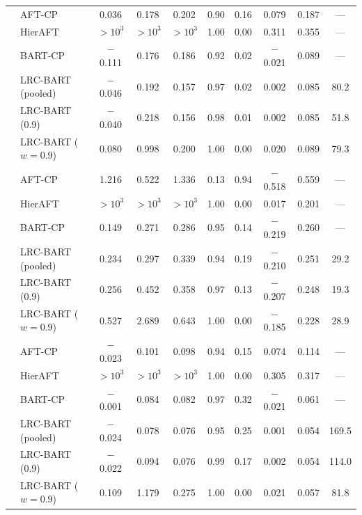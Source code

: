 \documentclass[11pt]{article}
\theoremstyle{definition}
\theoremstyle{plain}
\begin{document}
\begin{longtable}{llcccccccc}
\midrule
{} & AFT-CP & 0.036 & 0.178 & 0.202 & 0.90 & 0.16 & 0.079 & 0.187 & --- \\*
& HierAFT & $>\!10^{3}$ & $>\!10^{3}$ & $>\!10^{3}$ & 1.00 & 0.00 & 0.311 & 0.355 & --- \\*
& BART-CP & $-$0.111 & 0.176 & 0.186 & 0.92 & 0.02 & $-$0.021 & 0.089 & --- \\*
& LRC-BART (pooled) & $-$0.046 & 0.192 & 0.157 & 0.97 & 0.02 & 0.002 & 0.085 & 80.2 \\*
& LRC-BART (0.9) & $-$0.040 & 0.218 & 0.156 & 0.98 & 0.01 & 0.002 & 0.085 & 51.8 \\*
& LRC-BART ($w=0.9$) & 0.080 & 0.998 & 0.200 & 1.00 & 0.00 & 0.020 & 0.089 & 79.3 \\
\midrule
{} & AFT-CP & 1.216 & 0.522 & 1.336 & 0.13 & 0.94 & $-$0.518 & 0.559 & --- \\*
& HierAFT & $>\!10^{3}$ & $>\!10^{3}$ & $>\!10^{3}$ & 1.00 & 0.00 & 0.017 & 0.201 & --- \\*
& BART-CP & 0.149 & 0.271 & 0.286 & 0.95 & 0.14 & $-$0.219 & 0.260 & --- \\*
& LRC-BART (pooled) & 0.234 & 0.297 & 0.339 & 0.94 & 0.19 & $-$0.210 & 0.251 & 29.2 \\*
& LRC-BART (0.9) & 0.256 & 0.452 & 0.358 & 0.97 & 0.13 & $-$0.207 & 0.248 & 19.3 \\*
& LRC-BART ($w=0.9$) & 0.527 & 2.689 & 0.643 & 1.00 & 0.00 & $-$0.185 & 0.228 & 28.9 \\
\midrule
{} & AFT-CP & $-$0.023 & 0.101 & 0.098 & 0.94 & 0.15 & 0.074 & 0.114 & --- \\*
& HierAFT & $>\!10^{3}$ & $>\!10^{3}$ & $>\!10^{3}$ & 1.00 & 0.00 & 0.305 & 0.317 & --- \\*
& BART-CP & $-$0.001 & 0.084 & 0.082 & 0.97 & 0.32 & $-$0.021 & 0.061 & --- \\*
& LRC-BART (pooled) & $-$0.024 & 0.078 & 0.076 & 0.95 & 0.25 & 0.001 & 0.054 & 169.5 \\*
& LRC-BART (0.9) & $-$0.022 & 0.094 & 0.076 & 0.99 & 0.17 & 0.002 & 0.054 & 114.0 \\*
& LRC-BART ($w=0.9$) & 0.109 & 1.179 & 0.275 & 1.00 & 0.00 & 0.021 & 0.057 & 81.8 \\

\end{longtable}
\end{document}
